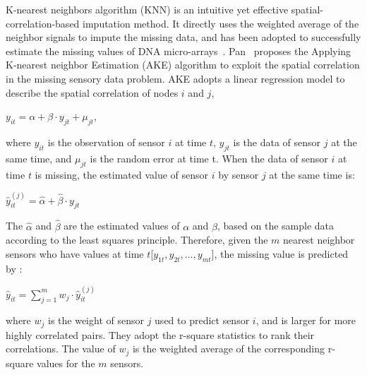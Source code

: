 K-nearest neighbors algorithm (KNN) is an intuitive yet effective spatial-correlation-based imputation method. 
It directly uses the weighted average of the neighbor signals to impute the missing data, and has been adopted to successfully 
estimate the missing values of DNA micro-arrays~\cite{Troyanskaya:DNAKNN}.  
Pan~\cite{pan2010k} proposes the Applying K-nearest neighbor Estimation (AKE) algorithm to exploit the spatial correlation in the 
missing sensory data problem. 
AKE adopts a linear regression model to describe the spatial correlation of nodes $i$ and $j$,
\begin{center}
$y_{it} = \alpha + \beta\cdot y_{jt} + \mu_{jt} $,
\end{center}
where $y_{it}$ is the observation of sensor $i$ at time $t$, $y_{jt}$ is the data of sensor $j$ at the same time, 
and $\mu_{jt}$ is the random error at time t.   
When the data of sensor $i$ at time $t$ is missing, the estimated value of sensor $i$ by sensor $j$ at the same time is:
\begin{center}
$\hat{y}_{it}^{(j)} =\hat{\alpha} +\hat{\beta}\cdot y_{jt}$
\end{center}
The $\hat{\alpha}$ and $\hat{\beta}$ are the estimated values of $\alpha$ and $\beta$, based on the sample data according to the least squares principle.
Therefore, given the $m$ nearest neighbor sensors who have values at time $t$[$y_{1t}, y_{2t},\dots, y_{mt}$], the missing value is predicted by :   
 \begin{center}
$ \hat{y}_{it} =\sum_{j=1}^m w_j \cdot \hat{y}_{it}^{(j)}$
 \end{center}
%
where $w_j$ is the weight of sensor $j$ used to predict sensor $i$, and is larger for more highly correlated pairs.
They adopt the r-square statistics to rank their correlations. The value of $w_j$ is the weighted average of the corresponding 
r-square values for the $m$ sensors. 

